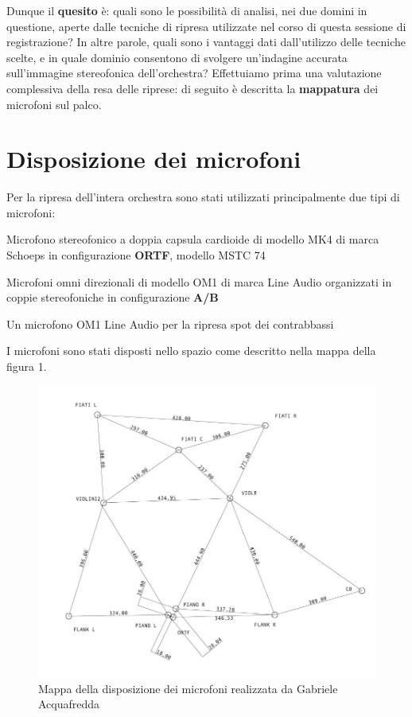 	Dunque il \textbf{quesito} è: quali sono le possibilità di analisi, nei due domini in questione, aperte dalle tecniche di ripresa utilizzate nel corso di questa sessione di registrazione?
	In altre parole, quali sono i vantaggi dati dall'utilizzo delle tecniche scelte, e in quale dominio consentono di svolgere un'indagine accurata sull'immagine stereofonica dell'orchestra?
	Effettuiamo prima una valutazione complessiva della resa delle riprese: di seguito è descritta la \textbf{mappatura} dei microfoni sul palco.
	
	\section*{Disposizione dei microfoni}
	Per la ripresa dell'intera orchestra sono stati utilizzati principalmente due tipi di microfoni:
	\begin{compactitem} 
		\item Microfono stereofonico a doppia capsula cardioide di modello MK4 di marca Schoeps in configurazione \textbf{ORTF}, modello MSTC 74
		\item Microfoni omni direzionali di modello OM1 di marca Line Audio organizzati in coppie stereofoniche in configurazione \textbf{A/B}
		\item Un microfono OM1 Line Audio per la ripresa spot dei contrabbassi
	\end{compactitem}
	I microfoni sono stati disposti nello spazio come descritto nella mappa della figura 1.
	
	\begin{figure}[h]
		\centering
		\includegraphics[width=.50\textwidth]{img/image2.jpg}
		\caption{Mappa della disposizione dei microfoni realizzata da Gabriele Acquafredda}
		\label{gs}
	\end{figure}
	
